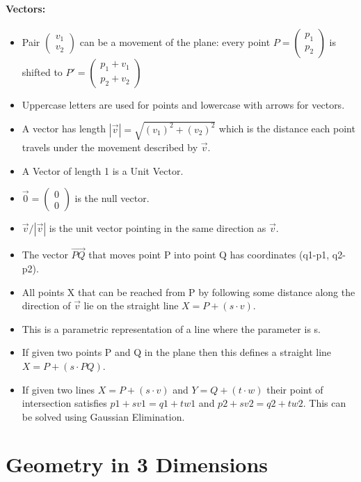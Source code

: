 \documentclass{article}
\begin{document}
\paragraph{Vectors:}
\begin{itemize}
\item
Pair
$\begin{pmatrix} v_1 \\ v_2 \end{pmatrix}$
can be a movement of the plane: every point
$P=\begin{pmatrix}p_1 \\ p_2\end{pmatrix}$
is shifted to
$P'=\begin{pmatrix}p_1+v_1 \\ p_2+v_2\end{pmatrix}$
\item Uppercase letters are used for points and lowercase with arrows for vectors.
\item A vector has length
$|\vec{v}|=\sqrt{(v_1)^2 + (v_2)^2}$
which is the distance each point travels under the movement described by $\vec{v}$.
\item A Vector of length 1 is a Unit Vector.
\item $\vec{0}=\begin{pmatrix}0\\0\end{pmatrix}$ is the null vector.
\item $\vec{v}/|\vec{v}|$ is the unit vector pointing in the same direction as $\vec{v}$.
\item The vector $\vec{PQ}$ that moves point P into point Q has coordinates (q1-p1, q2-p2).
\item All points X that can be reached from P by following some distance along the direction of $\vec{v}$ lie on the straight line $X = P + (s \cdot v)$.
\item This is a parametric representation of a line where the parameter is s.
\item If given two points P and Q in the plane then this defines a straight line $X = P + (s \cdot PQ)$.
\item If given two lines $X = P + (s \cdot v)$ and $Y = Q + (t\cdot w)$ their point of intersection satisfies $p1 + sv1 = q1 + tw1$ and $p2 + sv2 = q2 + tw2$. This can be solved using Gaussian Elimination.
\end{itemize}

\section{Geometry in 3 Dimensions}
\end{document}

